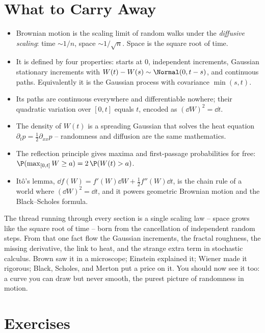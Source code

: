 \section{What to Carry Away}
\label{ch29:summary}

\begin{focusbox}
\begin{itemize}
  \item Brownian motion is the scaling limit of random walks under the
  \emph{diffusive scaling}: time $\sim 1/n$, space $\sim 1/\sqrt n$. Space is the
  square root of time.
  \item It is defined by four properties: starts at $0$, independent increments,
  Gaussian stationary increments with $W(t)-W(s)\sim\Normal(0,t-s)$, and
  continuous paths. Equivalently it is the Gaussian process with covariance
  $\min(s,t)$.
  \item Its paths are continuous everywhere and differentiable nowhere; their
  quadratic variation over $[0,t]$ equals $t$, encoded as $(\dd W)^2 = \dd t$.
  \item The density of $W(t)$ is a spreading Gaussian that solves the heat
  equation $\partial_t p = \tfrac12\partial_{xx}p$ -- randomness and diffusion are
  the same mathematics.
  \item The reflection principle gives maxima and first-passage probabilities for
  free: $\P(\max_{[0,t]}W\ge a) = 2\,\P(W(t)>a)$.
  \item It\^o's lemma, $\dd f(W) = f'(W)\dd W + \tfrac12 f''(W)\dd t$, is the chain
  rule of a world where $(\dd W)^2=\dd t$, and it powers geometric Brownian motion
  and the Black--Scholes formula.
\end{itemize}
\end{focusbox}

The thread running through every section is a single scaling law -- space grows
like the square root of time -- born from the cancellation of independent random
steps. From that one fact flow the Gaussian increments, the fractal roughness, the
missing derivative, the link to heat, and the strange extra term in stochastic
calculus. Brown saw it in a microscope; Einstein explained it; Wiener made it
rigorous; Black, Scholes, and Merton put a price on it. You should now see it too:
a curve you can draw but never smooth, the purest picture of randomness in motion.

\section{Exercises}
\label{ch29:exercises}

